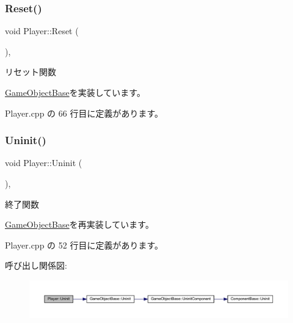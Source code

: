\subsubsection{\texorpdfstring{Reset()}{Reset()}}
{\footnotesize\ttfamily void Player\+::\+Reset (\begin{DoxyParamCaption}{ }\end{DoxyParamCaption})\hspace{0.3cm}{\ttfamily [override]}, {\ttfamily [virtual]}}



リセット関数 



\mbox{\hyperlink{class_game_object_base_a85c59554f734bcb09f1a1e18d9517dce}{Game\+Object\+Base}}を実装しています。



 Player.\+cpp の 66 行目に定義があります。

\mbox{\label{class_player_a7455a83ac23d2f5e0cce0ddd7d92db0c}} 
\subsubsection{\texorpdfstring{Uninit()}{Uninit()}}
{\footnotesize\ttfamily void Player\+::\+Uninit (\begin{DoxyParamCaption}{ }\end{DoxyParamCaption})\hspace{0.3cm}{\ttfamily [override]}, {\ttfamily [virtual]}}



終了関数 



\mbox{\hyperlink{class_game_object_base_a97e1bc277d7b1c0156d4735de29a022c}{Game\+Object\+Base}}を再実装しています。



 Player.\+cpp の 52 行目に定義があります。

呼び出し関係図\+:\nopagebreak
\begin{figure}[H]
\begin{center}
\leavevmode
\includegraphics[width=350pt]{class_player_a7455a83ac23d2f5e0cce0ddd7d92db0c_cgraph}
\end{center}
\end{figure}


